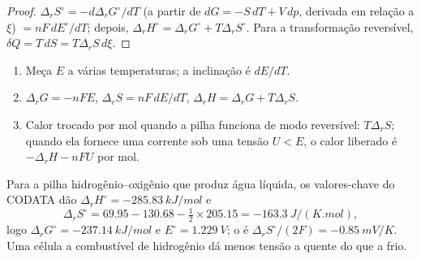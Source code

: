 \begin{proof}
$\Delta_r S^\circ = -d\Delta_r G^\circ/dT$ (a partir de $dG = -S\,dT + V\,dp$,
derivada em relação a $\xi$) $= nF\,dE^\circ/dT$; depois, $\Delta_r H^\circ = \Delta_r G^\circ
+ T\Delta_r S^\circ$. Para a transformação reversível, $\delta Q = T\,dS = T\Delta_r S\,
d\xi$.
\end{proof}

\begin{method}\label{met:b2:cell-thermodynamics:cell-data}
\begin{enumerate}
  \item Meça $E$ a várias temperaturas; a inclinação é $dE/dT$.
  \item $\Delta_r G = -nFE$, $\Delta_r S = nF\,dE/dT$, $\Delta_r H = \Delta_r G +
        T\Delta_r S$.
  \item Calor trocado por mol quando a pilha funciona de modo reversível:
        $T\Delta_r S$; quando ela fornece uma corrente sob uma tensão $U < E$,
        o calor liberado é $-\Delta_r H - nFU$ por mol.
\end{enumerate}
\end{method}

Para a pilha hidrogênio--oxigênio que produz água líquida, os valores-chave do
CODATA dão $\Delta_r H^\circ = \qty{-285.83}{kJ/mol}$ e
\[
  \Delta_r S^\circ = 69.95 - 130.68 - \tfrac12 \times 205.15 = \qty{-163.3}{J/(K.mol)} ,
\]
logo $\Delta_r G^\circ = \qty{-237.14}{kJ/mol}$ e $E^\circ = \qty{1.229}{V}$; o
 é $\Delta_r S^\circ/(2F) = \qty{-0.85}{mV/K}$. Uma
célula a combustível de hidrogênio dá menos tensão a quente do que a frio.

